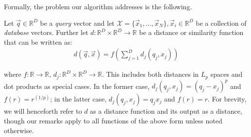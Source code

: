 \begin{table*}[t]
\begin{tabularx}{\linewidth}{X|YYYY}
\bottomrule
\end{tabularx}
\end{table*}

Formally, the problem our algorithm addresses is the following.

Let $\vec{q} \in \mathbb{R}^D$ be a \textit{query} vector and let $\mathcal{X} = \{\vec{x}_1,\ldots,\vec{x}_N\}, \vec{x}_i \in \mathbb{R}^D$ be a collection of \textit{database} vectors. Further let $d: \mathbb{R}^D \times \mathbb{R}^D \rightarrow \mathbb{R}$ be a distance or similarity function that can be written as:
\begin{align}
        d(\vec{q}, \vec{x}) = f(\sum_{j=1}^D d_j(q_j, x_j))
\end{align}


where $f: \mathbb{R} \rightarrow \mathbb{R}$, $d_j: \mathbb{R}^D \times \mathbb{R}^D \rightarrow \mathbb{R}$. This includes both distances in $L_p$ spaces and dot products as special cases. In the former case, $d_j(q_j, x_j) = (q_j - x_j)^p$ and $f(r) = r^{(1/p)}$; in the latter case, $d_j(q_j, x_j) = q_j x_j$ and $f(r) = r$. For brevity, we will henceforth refer to $d$ as a distance function and its output as a distance, though our remarks apply to all functions of the above form unless noted otherwise.

